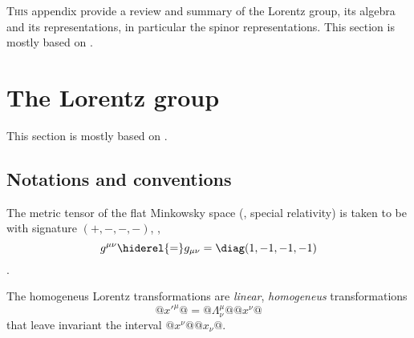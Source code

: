 

\lettrine{T}{his} appendix provide a review and summary of the
Lorentz group, its algebra and its representations, in particular the spinor
representations.
This section is mostly based on \textcite{Dreiner.Haber.ea:2010}.

\section{The Lorentz group}

This section is mostly based on \textcite{Barone:2004}.

\subsection{Notations and conventions}

The metric tensor of the flat Minkowsky space (\ie, special relativity) is
taken to be with signature $(+,-,-,-)$, \ie,
\begin{dmath}
   g^{\mu\nu} \hiderel{=} g_{\mu\nu} = \diag( 1, -1, -1,-1)
\end{dmath}.

The homogeneus Lorentz transformations are \emph{linear}, \emph{homogeneus}
transformations
\begin{dmath}
   @x\prime^{\mu}@ = @\Lambda^{\mu}_{\nu}@ @x^{\nu}@
\end{dmath}
that leave invariant the interval $@ x^{\nu} @@x_{\nu}@$.
   



